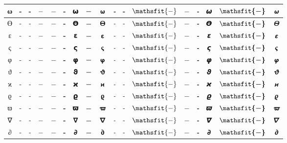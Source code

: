 \documentclass{standalone}
\newcommand{\SANS}[1]{\ifmmode\mathsf{#1}\else\textsf{#1}\fi}
\newcommand{\BSANS}[1]{\ifmmode\boldsymbol{\mathsf{#1}}\else\textbf{\textsf{#1}}\fi}
\newcommand{\ISANS}[1]{\ifmmode\mathsfit{#1}\else\textit{\textsf{#1}}\fi}
\newcommand{\BISANS}[1]{\ifmmode\bm{\mathsfit{#1}}\else\textbf{\textsf{\textit{#1}}}\fi}
\begin{document}
\begin{tabular}{c|cc|cc|cc|cc|cc|cc|cc|cc}
ω & \SANS{-} & - & $\SANS{-}$ & $-$ & \BSANS{-} & 𝞈 & $\BSANS{-}$ & $𝞈$ & \ISANS{-} & - & $\ISANS{-}$ & $-$ & \BISANS{-} & 𝟂 & $\BISANS{-}$ & $𝟂$ \\
\midrule
ϴ & \SANS{-} & - & $\SANS{-}$ & $-$ & \BSANS{-} & 𝝧 & $\BSANS{-}$ & $𝝧$ & \ISANS{-} & - & $\ISANS{-}$ & $-$ & \BISANS{-} & 𝞡 & $\BISANS{-}$ & $𝞡$ \\
ε & \SANS{-} & - & $\SANS{-}$ & $-$ & \BSANS{-} & 𝝴 & $\BSANS{-}$ & $𝝴$ & \ISANS{-} & - & $\ISANS{-}$ & $-$ & \BISANS{-} & 𝞮 & $\BISANS{-}$ & $𝞮$ \\
ς & \SANS{-} & - & $\SANS{-}$ & $-$ & \BSANS{-} & 𝞁 & $\BSANS{-}$ & $𝞁$ & \ISANS{-} & - & $\ISANS{-}$ & $-$ & \BISANS{-} & 𝞻 & $\BISANS{-}$ & $𝞻$ \\
φ & \SANS{-} & - & $\SANS{-}$ & $-$ & \BSANS{-} & 𝞅 & $\BSANS{-}$ & $𝞅$ & \ISANS{-} & - & $\ISANS{-}$ & $-$ & \BISANS{-} & 𝞿 & $\BISANS{-}$ & $𝞿$ \\
ϑ & \SANS{-} & - & $\SANS{-}$ & $-$ & \BSANS{-} & 𝞋 & $\BSANS{-}$ & $𝞋$ & \ISANS{-} & - & $\ISANS{-}$ & $-$ & \BISANS{-} & 𝟅 & $\BISANS{-}$ & $𝟅$ \\
ϰ & \SANS{-} & - & $\SANS{-}$ & $-$ & \BSANS{-} & 𝞌 & $\BSANS{-}$ & $𝞌$ & \ISANS{-} & - & $\ISANS{-}$ & $-$ & \BISANS{-} & 𝟆 & $\BISANS{-}$ & $𝟆$ \\
ϱ & \SANS{-} & - & $\SANS{-}$ & $-$ & \BSANS{-} & 𝞎 & $\BSANS{-}$ & $𝞎$ & \ISANS{-} & - & $\ISANS{-}$ & $-$ & \BISANS{-} & 𝟈 & $\BISANS{-}$ & $𝟈$ \\
ϖ & \SANS{-} & - & $\SANS{-}$ & $-$ & \BSANS{-} & 𝞏 & $\BSANS{-}$ & $𝞏$ & \ISANS{-} & - & $\ISANS{-}$ & $-$ & \BISANS{-} & 𝟉 & $\BISANS{-}$ & $𝟉$ \\
\midrule
∇ & \SANS{-} & - & $\SANS{-}$ & $-$ & \BSANS{-} & 𝝯 & $\BSANS{-}$ & $𝝯$ & \ISANS{-} & - & $\ISANS{-}$ & $-$ & \BISANS{-} & 𝞩 & $\BISANS{-}$ & $𝞩$ \\
∂ & \SANS{-} & - & $\SANS{-}$ & $-$ & \BSANS{-} & 𝞉 & $\BSANS{-}$ & $𝞉$ & \ISANS{-} & - & $\ISANS{-}$ & $-$ & \BISANS{-} & 𝟃 & $\BISANS{-}$ & $𝟃$ \\
\bottomrule
\end{tabular}
\end{document}
